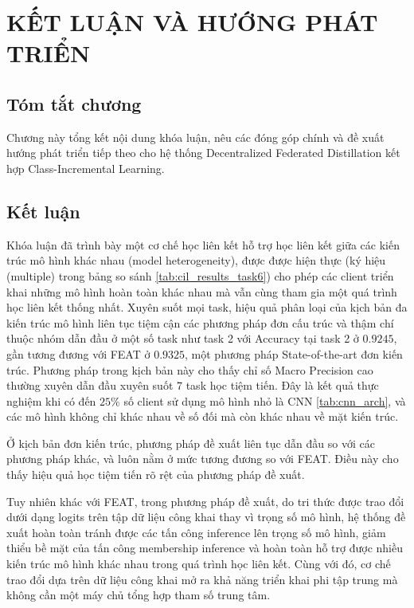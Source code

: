 \chapter{KẾT LUẬN VÀ HƯỚNG PHÁT TRIỂN}\label{Chapter5}

\section*{Tóm tắt chương}

Chương này tổng kết nội dung khóa luận, nêu các đóng góp chính và đề xuất hướng phát triển tiếp theo cho hệ thống Decentralized Federated Distillation kết hợp Class-Incremental Learning.

\section{Kết luận}

Khóa luận đã trình bày một cơ chế học liên kết hỗ trợ học liên kết giữa các kiến trúc mô hình khác nhau (model heterogeneity), được được hiện thực (ký hiệu (multiple) trong bảng so sánh \ref{tab:cil_results_task6}) cho phép các client triển khai những mô hình hoàn toàn khác nhau mà vẫn cùng tham gia một quá trình học liên kết thống nhất. Xuyên suốt mọi task, hiệu quả phân loại của kịch bản đa kiến trúc mô hình liên tục tiệm cận các phương pháp đơn cấu trúc và thậm chí thuộc nhóm dẫn đầu ở một số task như task 2 với Accuracy tại task 2 ở $0.9245$, gần tương đương với FEAT ở $0.9325$, một phương pháp State-of-the-art đơn kiến trúc. Phương pháp trong kịch bản này cho thấy chỉ số Macro Precision cao thường xuyên dẫn đầu xuyên suốt 7 task học tiệm tiến. Đây là kết quả thực nghiệm khi có đến $25\%$ số client sử dụng mô hình nhỏ là CNN \ref{tab:cnn_arch}, và các mô hình không chỉ khác nhau về số đối mà còn khác nhau về mặt kiến trúc.

Ở kịch bản đơn kiến trúc, phương pháp đề xuất liên tục dẫn đầu so với các phương pháp khác, và luôn nằm ở mức tương đương so với FEAT. Điều này cho thấy hiệu quả học tiệm tiến rõ rệt của phương pháp đề xuất.

Tuy nhiên khác với FEAT, trong phương pháp đề xuất, do tri thức được trao đổi dưới dạng logits trên tập dữ liệu công khai thay vì trọng số mô hình, hệ thống đề xuất hoàn toàn tránh được các tấn công inference lên trọng số mô hình, giảm thiểu bề mặt của tấn công membership inference và hoàn toàn hỗ trợ được nhiều kiến trúc mô hình khác nhau trong quá trình học liên kết. Cùng với đó, cơ chế trao đổi dựa trên dữ liệu công khai mở ra khả năng triển khai phi tập trung mà không cần một máy chủ tổng hợp tham số trung tâm.

